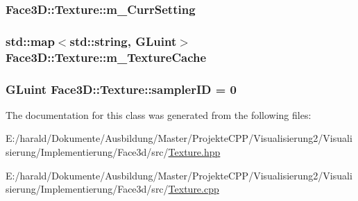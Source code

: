 \subsubsection[{\texorpdfstring{m\+\_\+\+Curr\+Setting}{m_CurrSetting}}]{ Face3\+D\+::\+Texture\+::m\+\_\+\+Curr\+Setting\hspace{0.3cm}{\ttfamily [private]}}\hypertarget{class_face3_d_1_1_texture_ab3ef103303845ee062b3c2d0618d6c32}{}\label{class_face3_d_1_1_texture_ab3ef103303845ee062b3c2d0618d6c32}
\subsubsection[{\texorpdfstring{m\+\_\+\+Texture\+Cache}{m_TextureCache}}]{\setlength{\rightskip}{0pt plus 5cm}std\+::map$<$std\+::string, G\+Luint$>$ Face3\+D\+::\+Texture\+::m\+\_\+\+Texture\+Cache\hspace{0.3cm}{\ttfamily [private]}}\hypertarget{class_face3_d_1_1_texture_a12f88846d60462abc4898b0a9cc54bf9}{}\label{class_face3_d_1_1_texture_a12f88846d60462abc4898b0a9cc54bf9}
\subsubsection[{\texorpdfstring{sampler\+ID}{samplerID}}]{\setlength{\rightskip}{0pt plus 5cm}G\+Luint Face3\+D\+::\+Texture\+::sampler\+ID = 0\hspace{0.3cm}{\ttfamily [private]}}\hypertarget{class_face3_d_1_1_texture_a4d9b0c399e52a64c72f096ffb768e6e7}{}\label{class_face3_d_1_1_texture_a4d9b0c399e52a64c72f096ffb768e6e7}


The documentation for this class was generated from the following files\+:\begin{DoxyCompactItemize}
\item 
E\+:/harald/\+Dokumente/\+Ausbildung/\+Master/\+Projekte\+C\+P\+P/\+Visualisierung2/\+Visualisierung/\+Implementierung/\+Face3d/src/\hyperlink{_texture_8hpp}{Texture.\+hpp}\item 
E\+:/harald/\+Dokumente/\+Ausbildung/\+Master/\+Projekte\+C\+P\+P/\+Visualisierung2/\+Visualisierung/\+Implementierung/\+Face3d/src/\hyperlink{_texture_8cpp}{Texture.\+cpp}\end{DoxyCompactItemize}

